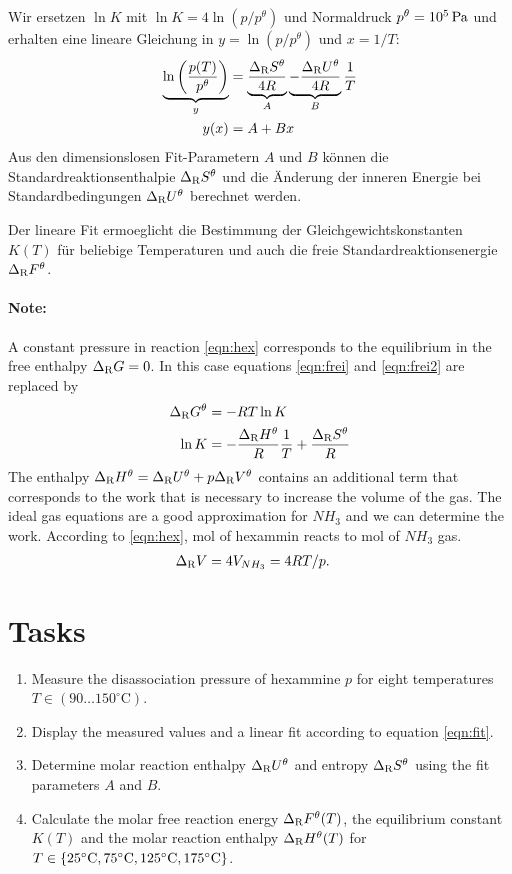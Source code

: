 \documentclass[ngerman,twocolumn,DIV21,a4,10pt]{scrartcl}
\begin{document}
Wir ersetzen $\ln K$ mit $\ln K=4\ln(p/p^\theta)$ und Normaldruck
$p^\theta = \unit[10^5]{Pa}$ und erhalten eine lineare Gleichung in $y
= \ln(p/p^\theta)$ und $x=1/T$:
\begin{align}
  \label{eqn:fit}
  \underbrace{\ln \left(\frac{p(T)}{p^\theta}\right)}_y &= 
  \underbrace{\frac{\Delta_\textrm{R} S^\theta}{4R}}_A \underbrace{-\frac{\Delta_\textrm{R} U^\theta}{4R}}_B
  \frac{1}{T} \\
  y(x) &= A+B x
\end{align}
Aus den dimensionslosen Fit-Parametern $A$ und $B$ können die
Standardreaktionsenthalpie $\Delta_\textrm{R} S^\theta$ und die \"Anderung der
inneren Energie bei Standardbedingungen $\Delta_\textrm{R} U^\theta$ berechnet
werden.

Der lineare Fit ermoeglicht die Bestimmung der
Gleichgewichtskonstanten $K(T)$ f\"ur beliebige Temperaturen und auch
die freie Standardreaktionsenergie $\Delta_\textrm{R} F^\theta$.

\paragraph{Note:}
A constant pressure in reaction \ref{eqn:hex} corresponds to the
equilibrium in the free enthalpy $\Delta_\textrm{R} G=0$. In this case equations
\eqref{eqn:frei} and \eqref{eqn:frei2} are replaced by
\begin{align}
\Delta_\textrm{R} G^\theta &= -RT \ln K \\
\ln K &= - \frac{\Delta_\textrm{R} H^\theta}{R} \frac{1}{T} + \frac{\Delta_\textrm{R} S^\theta}{R}
\end{align}
The enthalpy $\Delta_\textrm{R} H^\theta=\Delta_\textrm{R} U^\theta + p \Delta_\textrm{R} V^\theta$ contains an
additional term that corresponds to the work that is necessary to
increase the volume of the gas. The ideal gas equations are a good
approximation for $NH_3$ and we can determine the work. According to
\eqref{eqn:hex}, \unit[1]{mol} of hexammin reacts to \unit[4]{mol} of
$NH_3$ gas.
\begin{align}
\Delta_\textrm{R} V&= 4V_{NH_3}=4RT/p.
\end{align}
\section{Tasks}
\begin{enumerate}
\item Measure the disassociation pressure of hexammine $p$ for eight
  temperatures $T\in (90\ldots150^\circ\textrm{C})$.
\item Display the measured values and a linear fit according to
  equation \eqref{eqn:fit}.
\item Determine molar reaction enthalpy $\Delta_\textrm{R} U^\theta$ and entropy
  $\Delta_\textrm{R} S^\theta$ using the fit parameters $A$ and $B$.
\item Calculate the molar free reaction energy $\Delta_\textrm{R} F^\theta(T)$, the
  equilibrium constant $K(T)$ and the molar reaction enthalpy $\Delta_\textrm{R}
  H^\theta(T)$ for $T\in\{25{}^\circ\textrm{C},75{}^\circ\textrm{C},125{}^\circ\textrm{C},175{}^\circ\textrm{C}\}$.
\end{enumerate}
\end{document}
